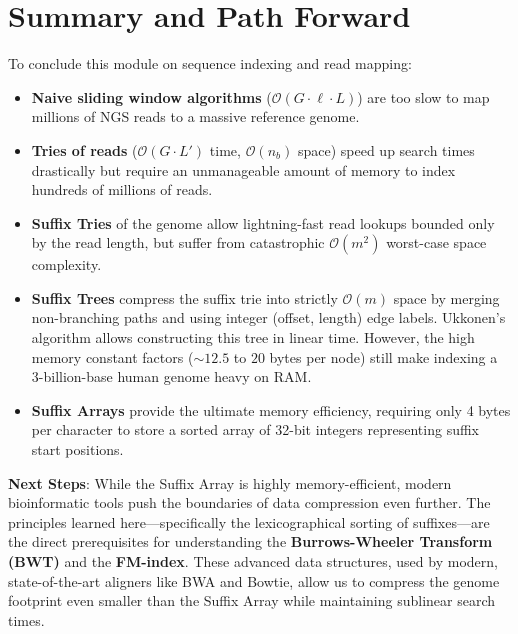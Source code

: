 \section{Summary and Path Forward}

To conclude this module on sequence indexing and read mapping:

\begin{itemize}
    \item \textbf{Naive sliding window algorithms} (\(\mathcal{O}(G \cdot \ell \cdot L)\)) are too slow to map millions of NGS reads to a massive reference genome.
    \item \textbf{Tries of reads} (\(\mathcal{O}(G \cdot L')\) time, \(\mathcal{O}(n_b)\) space) speed up search times drastically but require an unmanageable amount of memory to index hundreds of millions of reads.
    \item \textbf{Suffix Tries} of the genome allow lightning-fast read lookups bounded only by the read length, but suffer from catastrophic \(\mathcal{O}(m^2)\) worst-case space complexity.
    \item \textbf{Suffix Trees} compress the suffix trie into strictly \(\mathcal{O}(m)\) space by merging non-branching paths and using integer (offset, length) edge labels. Ukkonen's algorithm allows constructing this tree in linear time. However, the high memory constant factors ($\sim 12.5$ to $20$ bytes per node) still make indexing a 3-billion-base human genome heavy on RAM.
    \item \textbf{Suffix Arrays} provide the ultimate memory efficiency, requiring only 4 bytes per character to store a sorted array of 32-bit integers representing suffix start positions. 
\end{itemize}

\sta \textbf{Next Steps}: While the Suffix Array is highly memory-efficient, modern bioinformatic tools push the boundaries of data compression even further. The principles learned here—specifically the lexicographical sorting of suffixes—are the direct prerequisites for understanding the \textbf{Burrows-Wheeler Transform (BWT)} and the \textbf{FM-index}. These advanced data structures, used by modern, state-of-the-art aligners like BWA and Bowtie, allow us to compress the genome footprint even smaller than the Suffix Array while maintaining sublinear search times.
